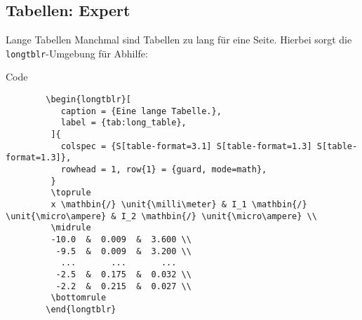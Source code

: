 \subsection{Tabellen: Expert}

\begin{frame}[fragile]{
  Lange Tabellen
  \hfill
}
   Manchmal sind Tabellen zu lang für eine Seite. Hierbei sorgt die \texttt{longtblr}-Umgebung für Abhilfe:

   \begin{block}{Code}
      \begin{verbatim}
        \begin{longtblr}[
           caption = {Eine lange Tabelle.},
           label = {tab:long_table},
         ]{
           colspec = {S[table-format=3.1] S[table-format=1.3] S[table-format=1.3]}, 
           rowhead = 1, row{1} = {guard, mode=math},
         }
         \toprule
         x \mathbin{/} \unit{\milli\meter} & I_1 \mathbin{/} \unit{\micro\ampere} & I_2 \mathbin{/} \unit{\micro\ampere} \\
         \midrule
         -10.0  &  0.009  &  3.600 \\
          -9.5  &  0.009  &  3.200 \\
           ...       ...       ...
          -2.5  &  0.175  &  0.032 \\
          -2.2  &  0.215  &  0.027 \\
         \bottomrule
        \end{longtblr}
      \end{verbatim}
   \end{block}
\end{frame}

